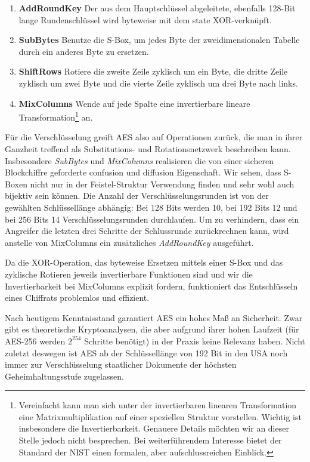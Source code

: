 \begin{enumerate}
	\small
	\item \textbf{AddRoundKey} Der aus dem Hauptschlüssel abgeleitete, ebenfalls 128-Bit lange Rundenschlüssel wird byteweise mit dem state XOR-verknüpft.
	\item \textbf{SubBytes} Benutze die S-Box, um jedes Byte der zweidimensionalen Tabelle durch ein anderes Byte zu ersetzen.
	\item \textbf{ShiftRows} Rotiere die zweite Zeile zyklisch um ein Byte, die dritte Zeile zyklisch um zwei Byte und die vierte Zeile zyklisch um drei Byte nach links.
	\item \textbf{MixColumns} Wende auf jede Spalte eine invertierbare lineare Transformation\footnote{Vereinfacht kann man sich unter der invertierbaren linearen Transformation eine Matrixmultiplikation auf einer speziellen Struktur vorstellen. Wichtig ist insbesondere die Invertierbarkeit. Genauere Details möchten wir an dieser Stelle jedoch nicht besprechen. Bei weiterführendem Interesse bietet der Standard der NIST \cite{NIST_AES01} einen formalen, aber aufschlussreichen Einblick.} an.
\end{enumerate}

Für die Verschlüsselung greift AES also auf Operationen zurück, die man in ihrer Ganzheit treffend als Substitutions- und Rotationsnetzwerk beschreiben kann. Insbesondere \textit{SubBytes} und \textit{MixColumns} realisieren die von einer sicheren Blockchiffre geforderte confusion und diffusion Eigenschaft. Wir sehen, dass S-Boxen nicht nur in der Feistel-Struktur Verwendung finden und sehr wohl auch bijektiv sein können.
Die Anzahl der Verschlüsselungsrunden ist von der gewählten Schlüssellänge abhängig: Bei 128 Bits werden 10, bei 192 Bits 12 und bei 256 Bits 14 Verschlüsselungsrunden durchlaufen. Um zu verhindern, dass ein Angreifer die letzten drei Schritte der Schlussrunde zurückrechnen kann, wird anstelle von MixColumns ein zusätzliches \textit{AddRoundKey} ausgeführt.

Da die XOR-Operation, das byteweise Ersetzen mittels einer S-Box und das zyklische Rotieren jeweils invertierbare Funktionen sind und wir die Invertierbarkeit bei MixColumns explizit fordern, funktioniert das Entschlüsseln eines Chiffrats problemlos und effizient.

Nach heutigem Kenntnisstand garantiert AES ein hohes Maß an Sicherheit. Zwar gibt es theoretische Kryptoanalysen, die aber aufgrund ihrer hohen Laufzeit (für AES-256 werden $2^{254}$ Schritte benötigt) in der Praxis keine Relevanz haben. Nicht zuletzt deswegen ist AES ab der Schlüssellänge von 192 Bit in den USA noch immer zur Verschlüsselung staatlicher Dokumente der höchsten Geheimhaltungsstufe zugelassen.

